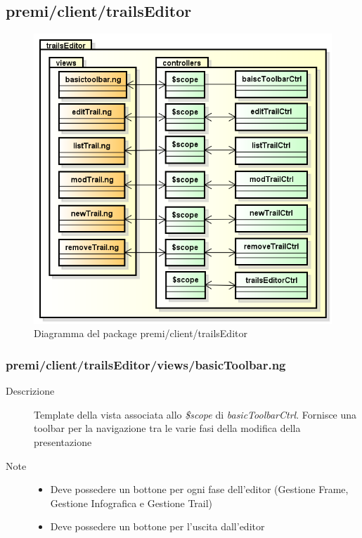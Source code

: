 \clearpage
\subsection{premi/client/trailsEditor}
\begin{figure}[H]
\begin{center}
\includegraphics[scale=0.75]{img/diapkg/trailsEditor.png}
\caption{Diagramma del package premi/client/trailsEditor}
\end{center}
\end{figure}

\subsubsection{premi/client/trailsEditor/views/basicToolbar.ng}

\begin{description}
\item[Descrizione] \hfill
	Template della vista associata allo \textit{\$scope} di \textit{basicToolbarCtrl}. Fornisce una toolbar per la navigazione tra le varie fasi della modifica della presentazione
\item[Note] \hfill
	\begin{itemize}
			\item Deve possedere un bottone per ogni fase dell'editor (Gestione Frame, Gestione Infografica e Gestione Trail)
			\item Deve possedere un bottone per l'uscita dall'editor
	\end{itemize}
\end{description}

